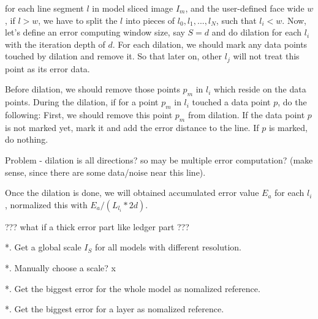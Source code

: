 \documentclass[12pt,letterpaper]{article}
\begin{document}
for each line segment $l$ in model sliced image $I_m$, and the user-defined face wide $w$,
if $l > w$, we have to split the $l$ into pieces of $l_0, l_1, ..., l_N$, such that 
$l_i < w$. Now, let's define an error computing window size, say $S = d$ and do dilation 
for each $l_i$ with the iteration depth of $d$. 
For each dilation, we should mark any data points touched by dilation and remove it. So that
later on, other $l_j$ will not treat this point as its error data.

Before dilation, we should remove those points $p_m$ in $l_i$ which reside on the data points.
During the dilation, if for a point $p_m$ in $l_i$ touched a data point $p$, do the following: 
First, we should remove this point $p_m$ from dilation. If the data point $p$ is not marked
yet, mark it and add the error distance to the line. If $p$ is marked, do nothing.

Problem - dilation is all directions? so may be multiple error computation? (make sense, since
there are some data/noise near this line).

Once the dilation is done, we will obtained accumulated error value $E_a$ for each $l_i$, 
normalized this with $E_a/(L_{l_i} * 2d)$. \newline \newline \newline


??? what if a thick error part like ledger part ???

*. Get a global scale $I_S$ for all models with different resolution.

*. Manually choose a scale? x

*. Get the biggest error for the whole model as nomalized reference.

*. Get the biggest error for a layer as nomalized reference.


\end{document}

